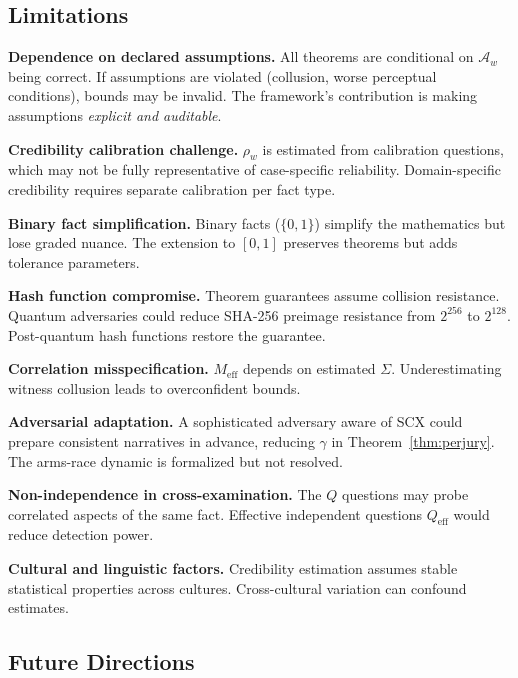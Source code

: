\documentclass[11pt,a4paper]{article}
\theoremstyle{definition}
\newcommand{\SCX}{\textsc{SCX}}
\newcommand{\limitationTag}[1]{\textsf{\textbf{[L#1]}}}
\begin{document}
\subsection{Limitations }

\begin{enumerate}[label=\limitationTag{\arabic*}]
    \item \textbf{Dependence on declared assumptions.} All theorems are conditional on $\mathcal{A}_w$ being correct. If assumptions are violated (collusion, worse perceptual conditions), bounds may be invalid. The framework's contribution is making assumptions \textit{explicit and auditable}.
    \item \textbf{Credibility calibration challenge.} $\rho_w$ is estimated from calibration questions, which may not be fully representative of case-specific reliability. Domain-specific credibility requires separate calibration per fact type.
    \item \textbf{Binary fact simplification.} Binary facts ($\{0, 1\}$) simplify the mathematics but lose graded nuance. The extension to $[0, 1]$ preserves theorems but adds tolerance parameters.
    \item \textbf{Hash function compromise.} Theorem guarantees assume collision resistance. Quantum adversaries could reduce SHA-256 preimage resistance from $2^{256}$ to $2^{128}$. Post-quantum hash functions restore the guarantee.
    \item \textbf{Correlation misspecification.} $M_{\mathrm{eff}}$ depends on estimated $\Sigma$. Underestimating witness collusion leads to overconfident bounds.
    \item \textbf{Adversarial adaptation.} A sophisticated adversary aware of \SCX{} could prepare consistent narratives in advance, reducing $\gamma$ in Theorem~\ref{thm:perjury}. The arms-race dynamic is formalized but not resolved.
    \item \textbf{Non-independence in cross-examination.} The $Q$ questions may probe correlated aspects of the same fact. Effective independent questions $Q_{\mathrm{eff}}$ would reduce detection power.
    \item \textbf{Cultural and linguistic factors.} Credibility estimation assumes stable statistical properties across cultures. Cross-cultural variation can confound estimates.
\end{enumerate}

\subsection{Future Directions}
\end{document}
